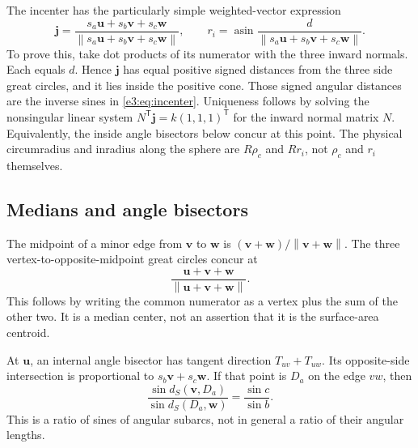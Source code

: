 \documentclass[11pt,letterpaper]{article}
\numberwithin{equation}{section}
\theoremstyle{definition}
\theoremstyle{remark}
\newcommand{\asin}{\operatorname{asin}}
\newcommand{\norm}[1]{\left\lVert#1\right\rVert}
\newcommand{\vv}[1]{\bm{#1}}
\newcommand{\transpose}{^{\mathsf T}}
\begin{document}
The incenter has the particularly simple weighted-vector expression
\begin{equation}\label{e3:eq:incenter}
 \vv j=\frac{s_a\vv u+s_b\vv v+s_c\vv w}
               {\norm{s_a\vv u+s_b\vv v+s_c\vv w}},\qquad
 r_i=\asin\frac{d}{\norm{s_a\vv u+s_b\vv v+s_c\vv w}}.
\end{equation}
To prove this, take dot products of its numerator with the three inward
normals. Each equals $d$. Hence $\vv j$ has equal positive signed distances
from the three side great circles, and it lies inside the positive cone.
Those signed angular distances are the inverse sines in
\cref{e3:eq:incenter}. Uniqueness follows by solving the nonsingular linear
system $N\transpose\vv j=k(1,1,1)\transpose$ for the inward normal matrix
$N$. Equivalently, the inside angle bisectors below concur at this point.
The physical circumradius and inradius along the sphere are $R\rho_c$ and
$Rr_i$, not $\rho_c$ and $r_i$ themselves.

\subsection{Medians and angle bisectors}

The midpoint of a minor edge from $\vv v$ to $\vv w$ is
$(\vv v+\vv w)/\norm{\vv v+\vv w}$. The three vertex-to-opposite-midpoint
great circles concur at
\[
 \frac{\vv u+\vv v+\vv w}{\norm{\vv u+\vv v+\vv w}}.
\]
This follows by writing the common numerator as a vertex plus the sum of
the other two. It is a median center, not an assertion that it is the
surface-area centroid.

At $\vv u$, an internal angle bisector has tangent direction
$T_{uv}+T_{uw}$. Its opposite-side intersection is proportional to
$s_b\vv v+s_c\vv w$. If that point is $D_a$ on the edge $vw$, then
\begin{equation}\label{e3:eq:spherebisector}
 \frac{\sin d_S(\vv v,D_a)}{\sin d_S(D_a,\vv w)}
       =\frac{\sin c}{\sin b}.
\end{equation}
This is a ratio of sines of angular subarcs, not in general a ratio of their
angular lengths.
\end{document}
